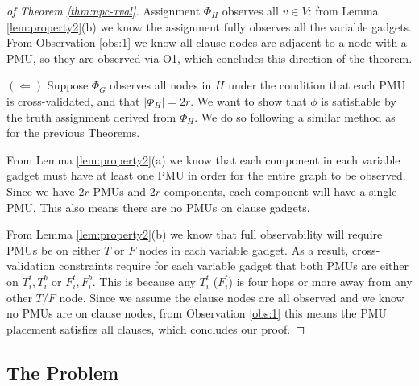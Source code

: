 \begin{proof}[of Theorem \ref{thm:npc-xval}]
Assignment $\Phi_H$ observes all $v \in V$: from Lemma \ref{lem:property2}(b) we know the assignment fully observes all the variable gadgets. From Observation \ref{obs:1} we know all clause nodes are adjacent to a node with a PMU, so they are observed via O1, which concludes this direction of the theorem.

$(\Leftarrow)$ Suppose $\Phi_G$ observes all nodes in $H$
under the condition that each PMU is cross-validated, and that $|\Phi_H|=2r$. We want to show that
$\phi$ is satisfiable by the truth assignment derived from $\Phi_H$. We do so following a similar method as for the previous Theorems.

From Lemma \ref{lem:property2}(a) we know that each component in each variable gadget must have at least one PMU in order for the entire graph to be observed. Since we have $2r$ PMUs and $2r$ components, each component will have a single PMU. This also means there are no PMUs on clause gadgets.

From Lemma \ref{lem:property2}(b) we know that full observability will require PMUs  be on either $T$ or $F$ nodes in each variable gadget. As a result,  cross-validation constraints require for each variable gadget that both PMUs are either on $T_i^t, T_i^b$ or $F_i^t, F_i^b$. This is because any $T_i^t$ ($F_i^t$) is four hops or more away from any other $T/F$ node. Since we assume the clause nodes are all observed and we know no PMUs are on clause nodes, from Observation \ref{obs:1} this means the PMU placement satisfies all clauses, which concludes our proof.
\end{proof}



\subsection{The \xvalpart Problem}
\label{subsec:xvalpart}

%
%


